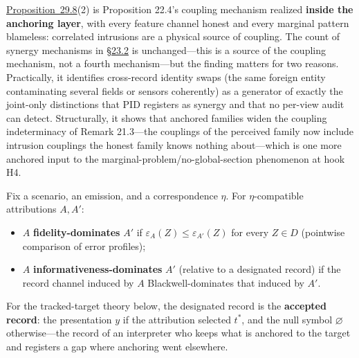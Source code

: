\hyperlink{stmt:29.8}{Proposition~29.8}(2) is Proposition 22.4's coupling mechanism realized \textbf{inside the anchoring layer}, with every feature channel honest and every marginal pattern blameless: correlated intrusions are a physical source of coupling. The count of synergy mechanisms in \hyperlink{sec:23.2}{§23.2} is unchanged---\hspace{0pt}this is a source of the coupling mechanism, not a fourth mechanism---\hspace{0pt}but the finding matters for two reasons. Practically, it identifies cross-record identity swaps (the same foreign entity contaminating several fields or sensors coherently) as a generator of exactly the joint-only distinctions that PID registers as synergy and that no per-view audit can detect. Structurally, it shows that anchored families widen the coupling indeterminacy of Remark 21.3---\hspace{0pt}the couplings of the perceived family now include intrusion couplings the honest family knows nothing about---\hspace{0pt}which is one more anchored input to the marginal-problem/no-global-section phenomenon at hook H4.



\begin{thmdef}

Fix a scenario, an emission, and a correspondence \(\eta\). For \(\eta\)-compatible attributions \(A, A'\):

\begin{itemize}
\tightlist
\item
  \(A\) \textbf{fidelity-dominates} \(A'\) if \(\varepsilon_A(Z) \le \varepsilon_{A'}(Z)\) for every \(Z \in D\) (pointwise comparison of error profiles);
\item
  \(A\) \textbf{informativeness-dominates} \(A'\) (relative to a designated record) if the record channel induced by \(A\) Blackwell-dominates that induced by \(A'\).
\end{itemize}

For the tracked-target theory below, the designated record is the \textbf{accepted record}: the presentation \(y\) if the attribution selected \(t^*\), and the null symbol \(\varnothing\) otherwise---\hspace{0pt}the record of an interpreter who keeps what is anchored to the target and registers a gap where anchoring went elsewhere.
\end{thmdef}

